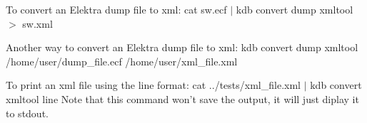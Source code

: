 To convert an Elektra dump file to xml\+: {\ttfamily cat sw.\+ecf $\vert$ kdb convert dump xmltool $>$ sw.\+xml}

Another way to convert an Elektra dump file to xml\+: {\ttfamily kdb convert dump xmltool /home/user/dump\+\_\+file.ecf /home/user/xml\+\_\+file.xml}

To print an xml file using the {\ttfamily line} format\+: {\ttfamily cat ../tests/xml\+\_\+file.xml $\vert$ kdb convert xmltool line} Note that this command won't save the output, it will just diplay it to {\ttfamily stdout}. 
